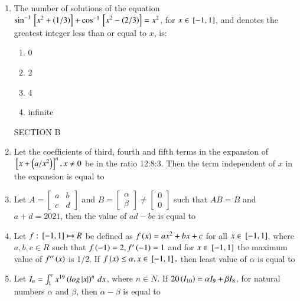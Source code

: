 \documentclass[journal]{IEEEtran}
\begin{document}
\begin{enumerate}
\item The number of solutions of the equation $\sin^{-1}{}\left[x^2+\left(1/3\right)\right]+\cos^{-1}{}\left[x^2-\left(2/3\right)\right]=x^2$, for $x \in {}\left[-1,1\right]$, and  denotes the greatest integer less than or equal to $x$, is:
\begin{enumerate}
    \item 0
    \item 2
    \item 4
    \item infinite
\end{enumerate}
SECTION B
\item Let the coefficients of third, fourth and fifth terms in the expansion of ${}\left[x+\left(a/x^2\right)\right]^n, x\neq 0$ be in the ratio 12:8:3. Then the term independent of $x$ in the expansion is equal to 

\item Let $A=\begin{bmatrix}a & b \\ c& d\end{bmatrix}$ and $B=\begin{bmatrix}\alpha \\ \beta\end{bmatrix}\neq \begin{bmatrix}0\\0\end{bmatrix}$ such that $AB=B$ and $a+d=2021$, then the value of $ad-bc$ is equal to 

\item Let $f: {}\left[-1,1\right]\mapsto R$ be defined as $f\left(x\right)=ax^2 +bx+c$ for all $x\in {}\left[-1,1\right]$, where $a,b,c \in R$ such that $f\left(-1\right)=2, f^{\prime}\left(-1\right)=1$ and for $x\in {}\left[-1,1\right]$ the maximum value of $f^{\prime\prime}\left(x\right)$ is 1/2. If $f\left(x\right)\leq \alpha, x\in {}\left[-1,1\right],$ then least value of $\alpha$ is equal to

\item Let $I_n = 
\int_{1}^{e} x^{19}\left(log\left\vert x\right\vert\right)^n \, dx$, where $n \in N$. If $20\left(I_{10}\right)=\alpha I_9+\beta I_8$, for natural numbers $\alpha$ and $\beta$, then $\alpha-\beta$ is equal to


\end{enumerate}
\end{document}

